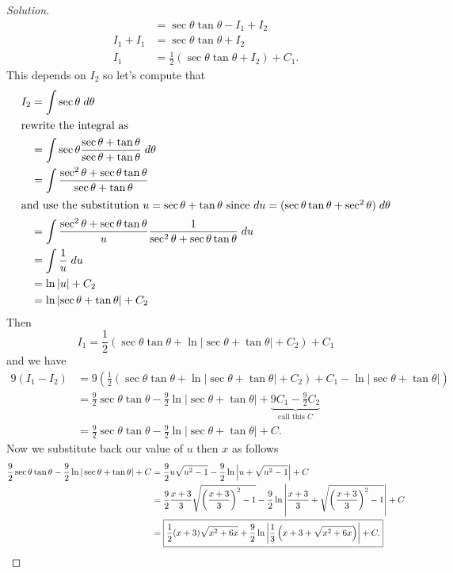 \begin{proof}[Solution]
\begin{align*}
&=\sec\theta\tan\theta-I_1+I_2\\
I_1+I_1&=\sec\theta\tan\theta+I_2\\
I_1&=\frac{1}{2}\left(\sec\theta\tan\theta+I_2\right)+C_1.
\end{align*}
This depends on $I_2$ so let's compute that
\begin{align*}
I_2&=\int\sec\theta\;d\theta\\
\intertext{rewrite the integral as}
&=\int\sec\theta\frac{\sec\theta+\tan\theta}{\sec\theta+\tan\theta}\;d\theta\\
&=\int\frac{\sec^2\theta+\sec\theta\tan\theta}{\sec\theta+\tan\theta}\\
\intertext{and use the substitution $u=\sec\theta+\tan\theta$ since
  $du=(\sec\theta\tan\theta+\sec^2\theta)\;d\theta$}
&=\int\frac{\sec^2\theta+\sec\theta\tan\theta}{u}\frac{1}{\sec^2\theta+\sec\theta\tan\theta}\;du\\
&=\int\frac{1}{u}\;du\\
&=\ln|u|+C_2\\
&=\ln\left|\sec\theta+\tan\theta\right|+C_2
\end{align*}
Then
$$
I_1=\frac{1}{2}(\sec\theta\tan\theta+\ln|\sec\theta+\tan\theta|+C_2)+C_1
$$
and we have
\begin{align*}
9(I_1-I_2)
&=9\left(
\frac{1}{2}(\sec\theta\tan\theta+\ln|\sec\theta+\tan\theta|+C_2)+C_1
-\ln|\sec\theta+\tan\theta|
\right)\\
&=\frac{9}{2}\sec\theta\tan\theta-\frac{9}{2}\ln|\sec\theta+\tan\theta|+
\underbrace{9C_1-\frac{9}{2}C_2}_{\text{call this $C$}}\\
&=\frac{9}{2}\sec\theta\tan\theta-\frac{9}{2}\ln|\sec\theta+\tan\theta|+C.
\end{align*}
Now we substitute back our value of $u$ then $x$ as follows
\begin{align*}
\frac{9}{2}\sec\theta\tan\theta-\frac{9}{2}\ln|\sec\theta+\tan\theta|+C
&=\frac{9}{2}u\sqrt{u^2-1}-\frac{9}{2}\ln\left|u+\sqrt{u^2-1}\right|+C\\
&=\frac{9}{2}\frac{x+3}{3}\sqrt{\left(\frac{x+3}{3}\right)^2-1}
-\frac{9}{2}\ln\left|\frac{x+3}{3}+\sqrt{\left(\frac{x+3}{3}\right)^2-1}\right|+C\\
&=\boxed{\frac{1}{2}(x+3)\sqrt{x^2+6x}
+\frac{9}{2}\ln\left|\frac{1}{3}\left(x+3+\sqrt{x^2+6x}\right)\right|
+C.}\qedhere
\end{align*}
\end{proof}

